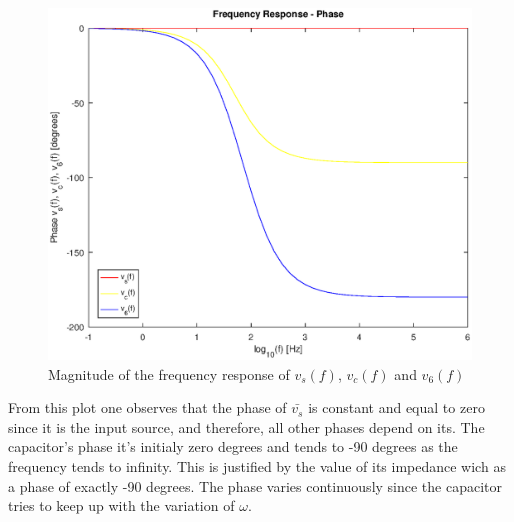 \begin{figure}[H] \centering
\includegraphics[width=0.8\linewidth]{phase_ang.eps}
\caption{Magnitude of the frequency response of $v_s(f)$, $v_c(f)$ and $v_6(f)$}
\label{fig:phase_theo}
\end{figure}

From this plot one observes that the phase of  $\bar{v_s}$ is constant and equal to zero since it is the input source, and therefore, all other phases depend on its.
The capacitor's phase it's initialy zero degrees and tends to -90 degrees as the frequency tends to infinity. This is justified by the value of its impedance wich as a phase of exactly -90 degrees. The phase varies continuously since the capacitor tries to keep up with the variation of $\omega$.

